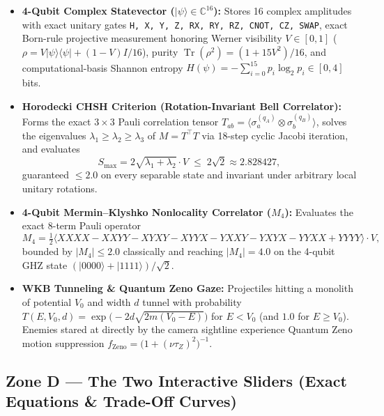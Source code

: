 \documentclass[10pt,letterpaper]{article}
\begin{document}
\begin{itemize}[leftmargin=1.5em, itemsep=2pt]
  \item \textbf{4-Qubit Complex Statevector ($|\psi\rangle \in \mathbb{C}^{16}$):} Stores 16 complex amplitudes with exact unitary gates \texttt{H, X, Y, Z, RX, RY, RZ, CNOT, CZ, SWAP}, exact Born-rule projective measurement honoring Werner visibility $V \in [0, 1]$ ($\rho = V|\psi\rangle\langle\psi| + (1-V)I/16$), purity $\operatorname{Tr}(\rho^2) = (1 + 15V^2)/16$, and computational-basis Shannon entropy $H(\psi) = -\sum_{i=0}^{15} p_i \log_2 p_i \in [0, 4]$ bits.
  \item \textbf{Horodecki CHSH Criterion (Rotation-Invariant Bell Correlator):} Forms the exact $3\times 3$ Pauli correlation tensor $T_{ab} = \langle \sigma_a^{(q_A)} \otimes \sigma_b^{(q_B)} \rangle$, solves the eigenvalues $\lambda_1 \ge \lambda_2 \ge \lambda_3$ of $M = T^\top T$ via 18-step cyclic Jacobi iteration, and evaluates
  \begin{equation}
    S_{\max} = 2\sqrt{\lambda_1 + \lambda_2}\cdot V \;\le\; 2\sqrt{2} \approx 2.828427,
  \end{equation}
  guaranteed $\le 2.0$ on every separable state and invariant under arbitrary local unitary rotations.
  \item \textbf{4-Qubit Mermin--Klyshko Nonlocality Correlator ($M_4$):} Evaluates the exact 8-term Pauli operator
  \begin{equation}
    M_4 = \tfrac{1}{2}\langle XXXX - XXYY - XYXY - XYYX - YXXY - YXYX - YYXX + YYYY\rangle \cdot V,
  \end{equation}
  bounded by $|M_4| \le 2.0$ classically and reaching $|M_4| = 4.0$ on the 4-qubit GHZ state $(|0000\rangle+|1111\rangle)/\sqrt{2}$.
  \item \textbf{WKB Tunneling \& Quantum Zeno Gaze:} Projectiles hitting a monolith of potential $V_0$ and width $d$ tunnel with probability $T(E,V_0,d) = \exp\!\bigl(-2d\sqrt{2m(V_0 - E)}\bigr)$ for $E < V_0$ (and $1.0$ for $E \ge V_0$). Enemies stared at directly by the camera sightline experience Quantum Zeno motion suppression $f_{\text{Zeno}} = \bigl(1 + (\nu \tau_Z)^2\bigr)^{-1}$.
\end{itemize}

\subsection{Zone D --- The Two Interactive Sliders (Exact Equations \& Trade-Off Curves)}
\end{document}
